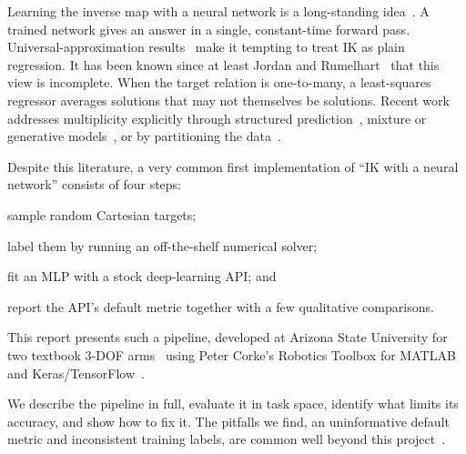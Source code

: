 \documentclass[conference]{IEEEtran}
\begin{document}
Learning the inverse map with a neural network is a long-standing idea~\cite{guez1988solution,jordan1992forward,dsouza2001learning,oyama2001modular,bocsi2011learning,csiszar2017solving}. A trained network gives an answer in a single, constant-time forward pass. Universal-approximation results~\cite{hornik1989multilayer} make it tempting to treat IK as plain regression. It has been known since at least Jordan and Rumelhart~\cite{jordan1992forward} that this view is incomplete. When the target relation is one-to-many, a least-squares regressor averages solutions that may not themselves be solutions. Recent work addresses multiplicity explicitly through structured prediction~\cite{bocsi2011learning}, mixture or generative models~\cite{bishop1994mixture,ardizzone2019analyzing,ames2022ikflow}, or by partitioning the data~\cite{csiszar2017solving}.

Despite this literature, a very common first implementation of ``IK with a neural network'' consists of four steps:
\begin{enumerate*}[label=(\arabic*)]
\item sample random Cartesian targets;
\item label them by running an off-the-shelf numerical solver;
\item fit an MLP with a stock deep-learning API; and
\item report the API's default metric together with a few qualitative comparisons.
\end{enumerate*}
This report presents such a pipeline, developed at Arizona State University for two textbook 3-DOF arms~\cite{siciliano2009robotics} using Peter Corke's Robotics Toolbox for MATLAB~\cite{corke1996toolbox,corke2017rvc} and Keras/TensorFlow~\cite{chollet2015keras,abadi2016tensorflow}.

We describe the pipeline in full, evaluate it in task space, identify what limits its accuracy, and show how to fix it. The pitfalls we find, an uninformative default metric and inconsistent training labels, are common well beyond this project~\cite{pineau2021improving,kapoor2023leakage}.
\end{document}
